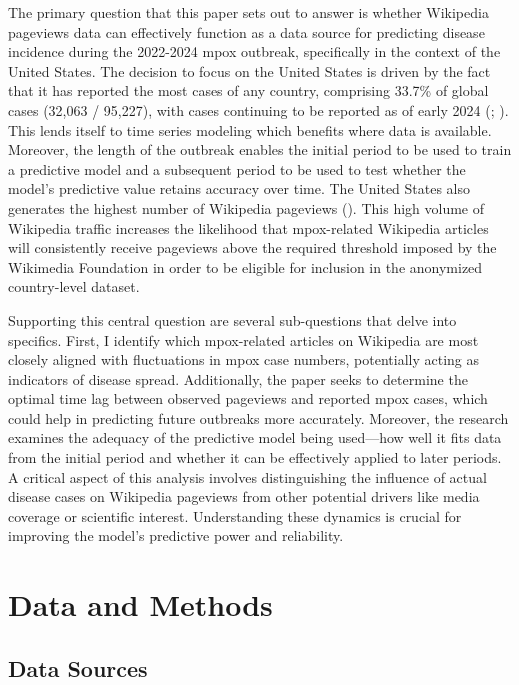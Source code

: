 \documentclass[
  12pt,
]{article}
\begin{document}
The primary question that this paper sets out to answer is whether
Wikipedia pageviews data can effectively function as a data source for
predicting disease incidence during the 2022-2024 mpox outbreak,
specifically in the context of the United States. The decision to focus
on the United States is driven by the fact that it has reported the most
cases of any country, comprising 33.7\% of global cases (32,063 /
95,227), with cases continuing to be reported as of early 2024
(; ).
This lends itself to time series modeling which benefits where data is
available. Moreover, the length of the outbreak enables the initial
period to be used to train a predictive model and a subsequent period to
be used to test whether the model's predictive value retains accuracy
over time. The United States also generates the highest number of
Wikipedia pageviews (). This high volume of Wikipedia traffic increases the likelihood
that mpox-related Wikipedia articles will consistently receive pageviews
above the required threshold imposed by the Wikimedia Foundation in
order to be eligible for inclusion in the anonymized country-level
dataset.~

Supporting this central question are several sub-questions that delve
into specifics. First, I identify which mpox-related articles on
Wikipedia are most closely aligned with fluctuations in mpox case
numbers, potentially acting as indicators of disease spread.
Additionally, the paper seeks to determine the optimal time lag between
observed pageviews and reported mpox cases, which could help in
predicting future outbreaks more accurately. Moreover, the research
examines the adequacy of the predictive model being used---how well it
fits data from the initial period and whether it can be effectively
applied to later periods. A critical aspect of this analysis involves
distinguishing the influence of actual disease cases on Wikipedia
pageviews from other potential drivers like media coverage or scientific
interest. Understanding these dynamics is crucial for improving the
model's predictive power and reliability.

\section{Data and Methods}\label{data-and-methods}

\subsection{Data Sources}\label{data-sources}
\end{document}
